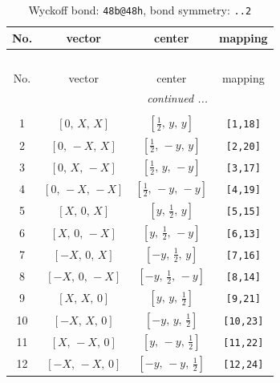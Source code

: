 \documentclass[fleqn,8pt]{jsarticle}
\begin{document}
\renewcommand{\arraystretch}{1.2}
\begin{longtable}{cccc}
\caption{Wyckoff bond: {\tt 48b@48h}, bond symmetry: {\tt ..2}}
 \\
 \hline \hline
No. & vector & center & mapping \\ \hline \endfirsthead

\multicolumn{3}{l}{\tablename\ \thetable{}} \\
 \hline \hline
No. & vector & center & mapping \\ \hline \endhead

 \hline \hline
\multicolumn{3}{r}{\footnotesize\it continued ...} \\ \endfoot

 \hline \hline
\multicolumn{3}{r}{} \\ \endlastfoot

1 & $\left[ 0,\, X,\, X \right]$ & $\left[ \frac{1}{2},\, y,\, y \right]$ & {\tt [1,18]} \\ \hline
2 & $\left[ 0,\, - X,\, X \right]$ & $\left[ \frac{1}{2},\, - y,\, y \right]$ & {\tt [2,20]} \\ \hline
3 & $\left[ 0,\, X,\, - X \right]$ & $\left[ \frac{1}{2},\, y,\, - y \right]$ & {\tt [3,17]} \\ \hline
4 & $\left[ 0,\, - X,\, - X \right]$ & $\left[ \frac{1}{2},\, - y,\, - y \right]$ & {\tt [4,19]} \\ \hline
5 & $\left[ X,\, 0,\, X \right]$ & $\left[ y,\, \frac{1}{2},\, y \right]$ & {\tt [5,15]} \\ \hline
6 & $\left[ X,\, 0,\, - X \right]$ & $\left[ y,\, \frac{1}{2},\, - y \right]$ & {\tt [6,13]} \\ \hline
7 & $\left[ - X,\, 0,\, X \right]$ & $\left[ - y,\, \frac{1}{2},\, y \right]$ & {\tt [7,16]} \\ \hline
8 & $\left[ - X,\, 0,\, - X \right]$ & $\left[ - y,\, \frac{1}{2},\, - y \right]$ & {\tt [8,14]} \\ \hline
9 & $\left[ X,\, X,\, 0 \right]$ & $\left[ y,\, y,\, \frac{1}{2} \right]$ & {\tt [9,21]} \\ \hline
10 & $\left[ - X,\, X,\, 0 \right]$ & $\left[ - y,\, y,\, \frac{1}{2} \right]$ & {\tt [10,23]} \\ \hline
11 & $\left[ X,\, - X,\, 0 \right]$ & $\left[ y,\, - y,\, \frac{1}{2} \right]$ & {\tt [11,22]} \\ \hline
12 & $\left[ - X,\, - X,\, 0 \right]$ & $\left[ - y,\, - y,\, \frac{1}{2} \right]$ & {\tt [12,24]} \\
\end{longtable}
\end{document}
